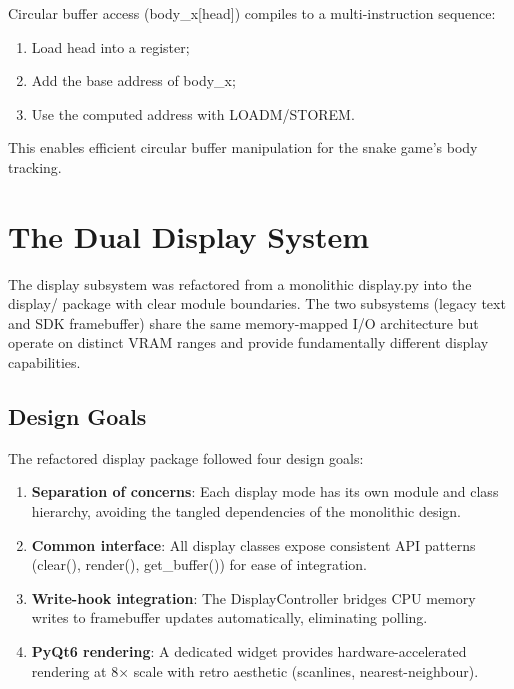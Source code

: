 \documentclass[12pt,a4paper,twoside]{book}
\theoremstyle{trinarytheorem}
\theoremstyle{trinarydefinition}
\newcommand{\code}[1]{\textsf{#1}}
\begin{document}
Circular buffer access (\code{body\_x[head]}) compiles to a multi-instruction
sequence:
\begin{enumerate}
    \item Load \code{head} into a register;
    \item Add the base address of \code{body\_x};
    \item Use the computed address with LOADM/STOREM.
\end{enumerate}

This enables efficient circular buffer manipulation for the snake game's body tracking.

\chapter{The Dual Display System}
\label{ch:dualdisplay}

The display subsystem was refactored from a monolithic \code{display.py} into the
\code{display/} package with clear module boundaries. The two subsystems (legacy
text and SDK framebuffer) share the same memory-mapped I/O architecture but operate
on distinct VRAM ranges and provide fundamentally different display capabilities.

\section{Design Goals}

The refactored display package followed four design goals:
\begin{enumerate}
    \item \textbf{Separation of concerns}: Each display mode has its own module and
          class hierarchy, avoiding the tangled dependencies of the monolithic design.
    \item \textbf{Common interface}: All display classes expose consistent API
          patterns (\code{clear()}, \code{render()}, \code{get\_buffer()}) for
          ease of integration.
    \item \textbf{Write-hook integration}: The \code{DisplayController} bridges
          CPU memory writes to framebuffer updates automatically, eliminating polling.
    \item \textbf{PyQt6 rendering}: A dedicated widget provides hardware-accelerated
          rendering at 8$\times$ scale with retro aesthetic (scanlines, nearest-neighbour).
\end{enumerate}
\end{document}
